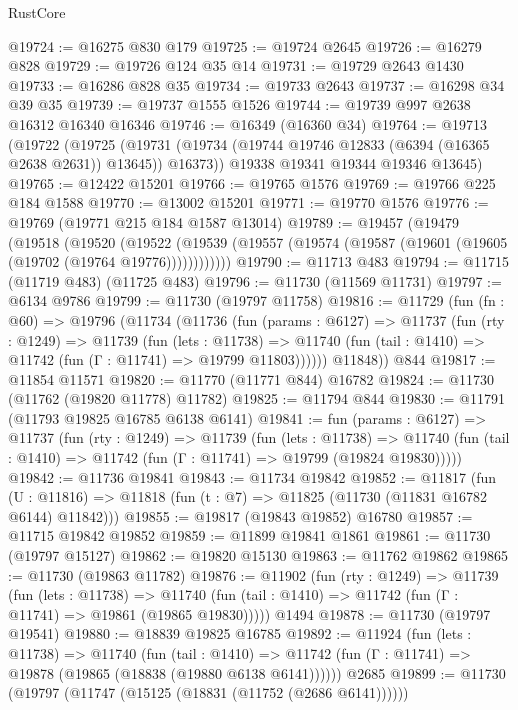 \begin{lexlean}{RustCore}
\begin{coremodule}
@19724 := @16275 @830 @179
@19725 := @19724 @2645
@19726 := @16279 @828
@19729 := @19726 @124 @35 @14
@19731 := @19729 @2643 @1430
@19733 := @16286 @828 @35
@19734 := @19733 @2643
@19737 := @16298 @34 @39 @35
@19739 := @19737 @1555 @1526
@19744 := @19739 @997 @2638 @16312 @16340 @16346
@19746 := @16349 (@16360 @34)
@19764 := @19713
    (@19722
      (@19725 (@19731 (@19734 (@19744 @19746 @12833 (@6394 (@16365 @2638 @2631)) @13645)) @16373))
      @19338
      @19341
      @19344
      @19346
      @13645)
@19765 := @12422 @15201
@19766 := @19765 @1576
@19769 := @19766 @225 @184 @1588
@19770 := @13002 @15201
@19771 := @19770 @1576
@19776 := @19769 (@19771 @215 @184 @1587 @13014)
@19789 := @19457
    (@19479
      (@19518
        (@19520
          (@19522 (@19539 (@19557 (@19574 (@19587 (@19601 (@19605 (@19702 (@19764 @19776))))))))))))
@19790 := @11713 @483
@19794 := @11715 (@11719 @483) (@11725 @483)
@19796 := @11730 (@11569 @11731)
@19797 := @6134 @9786
@19799 := @11730 (@19797 @11758)
@19816 := @11729
    (fun (fn : @60) =>
    @19796
      (@11734
        (@11736
          (fun (params : @6127) =>
          @11737
            (fun (rty : @1249) =>
            @11739
              (fun (lets : @11738) =>
              @11740 (fun (tail : @1410) => @11742 (fun (Γ : @11741) => @19799 @11803))))))
        @11848))
    @844
@19817 := @11854 @11571
@19820 := @11770 (@11771 @844) @16782
@19824 := @11730 (@11762 (@19820 @11778) @11782)
@19825 := @11794 @844
@19830 := @11791 (@11793 @19825 @16785 @6138 @6141)
@19841 := fun (params : @6127) =>
  @11737
    (fun (rty : @1249) =>
    @11739
      (fun (lets : @11738) =>
      @11740 (fun (tail : @1410) => @11742 (fun (Γ : @11741) => @19799 (@19824 @19830)))))
@19842 := @11736 @19841
@19843 := @11734 @19842
@19852 := @11817
    (fun (U : @11816) => @11818 (fun (t : @7) => @11825 (@11730 (@11831 @16782 @6144) @11842)))
@19855 := @19817 (@19843 @19852) @16780
@19857 := @11715 @19842 @19852
@19859 := @11899 @19841 @1861
@19861 := @11730 (@19797 @15127)
@19862 := @19820 @15130
@19863 := @11762 @19862
@19865 := @11730 (@19863 @11782)
@19876 := @11902
    (fun (rty : @1249) =>
    @11739
      (fun (lets : @11738) =>
      @11740 (fun (tail : @1410) => @11742 (fun (Γ : @11741) => @19861 (@19865 @19830)))))
    @1494
@19878 := @11730 (@19797 @19541)
@19880 := @18839 @19825 @16785
@19892 := @11924
    (fun (lets : @11738) =>
    @11740
      (fun (tail : @1410) =>
      @11742 (fun (Γ : @11741) => @19878 (@19865 (@18838 (@19880 @6138 @6141))))))
    @2685
@19899 := @11730 (@19797 (@11747 (@15125 (@18831 (@11752 (@2686 @6141))))))

\end{coremodule}
\end{lexlean}
